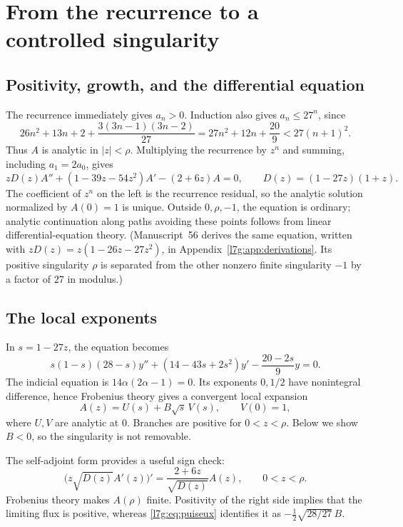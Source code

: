\documentclass[11pt,letterpaper]{article}
\theoremstyle{remark}\newtheorem{remark}[theorem]{Remark}
\newcounter{l7gtrsavedeq}
\begin{document}
\section{From the recurrence to a controlled singularity}\label{l7g:sec:singularity}
\subsection{Positivity, growth, and the differential equation}
The recurrence immediately gives $a_n>0$. Induction also gives
$a_n\le27^n$, since
\[
26n^2+13n+2+\frac{3(3n-1)(3n-2)}{27}
=27n^2+12n+\frac{20}{9}<27(n+1)^2.
\]
Thus $A$ is analytic in $|z|<\rho$. Multiplying the recurrence by $z^n$
and summing, including $a_1=2a_0$, gives
\begin{equation}\label{l7g:eq:ODE}
 zD(z)A''+(1-39z-54z^2)A'-(2+6z)A=0,
 \qquad D(z)=(1-27z)(1+z).
\end{equation}
The coefficient of $z^n$ on the left is the recurrence residual, so the
analytic solution normalized by $A(0)=1$ is unique. Outside
$0,\rho,-1$, the equation is ordinary; analytic continuation along paths
avoiding these points follows from linear differential-equation theory.
(Manuscript~56 derives the same equation, written with
$zD(z)=z(1-26z-27z^2)$, in Appendix~\ref{l7g:app:derivations}. Its
positive singularity $\rho$ is separated from the other nonzero finite
singularity $-1$ by a factor of $27$ in modulus.)

\subsection{The local exponents}
In $s=1-27z$, the equation becomes
\begin{equation}\label{l7g:eq:sODE}
 s(1-s)(28-s)y''+(14-43s+2s^2)y'-\frac{20-2s}{9}y=0.
\end{equation}
The indicial equation is $14\alpha(2\alpha-1)=0$. Its exponents $0,1/2$
have nonintegral difference, hence Frobenius theory gives a convergent
local expansion
\begin{equation}\label{l7g:eq:puiseux}
 A(z)=U(s)+B\sqrt{s}\,V(s),\qquad V(0)=1,
\end{equation}
where $U,V$ are analytic at $0$. Branches are positive for $0<z<\rho$.
Below we show $B<0$, so the singularity is not removable.

The self-adjoint form provides a useful sign check:
\begin{equation}\label{l7g:eq:flux}
 \bigl(z\sqrt{D(z)}A'(z)\bigr)'
   =\frac{2+6z}{\sqrt{D(z)}}A(z),\qquad 0<z<\rho.
\end{equation}
Frobenius theory makes $A(\rho)$ finite. Positivity of the right side
implies that the limiting flux is positive, whereas \eqref{l7g:eq:puiseux}
identifies it as $-\tfrac12\sqrt{28/27}\,B$.
\end{document}
